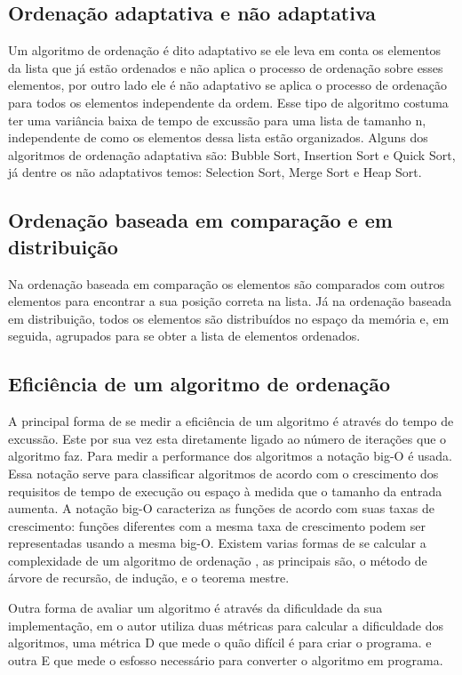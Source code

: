 \documentclass[12pt]{article}
\begin{document}
\subsection{Ordenação adaptativa e não adaptativa}
Um algoritmo de ordenação é dito adaptativo se ele leva em conta os elementos da lista que já estão ordenados e não aplica o processo de ordenação sobre esses elementos, por outro lado ele é não adaptativo se aplica o processo de ordenação para todos os elementos independente da ordem. Esse tipo de algoritmo costuma ter uma variância baixa de tempo de excussão para uma lista de tamanho n, independente de como os elementos dessa lista estão organizados. Alguns dos algoritmos de ordenação adaptativa são: Bubble Sort, Insertion Sort e Quick Sort, já dentre os não adaptativos temos: Selection Sort, Merge Sort e Heap Sort.

\subsection{Ordenação baseada em comparação e em distribuição}
Na ordenação baseada em comparação os elementos são comparados com outros elementos para encontrar a sua posição correta na lista. Já na ordenação baseada em distribuição, todos os elementos são distribuídos no espaço da memória e, em seguida, agrupados para se obter a lista de elementos ordenados. 

\subsection{Eficiência de um algoritmo de ordenação}
A principal forma de se medir a eficiência de um algoritmo é através do tempo de excussão. Este por sua vez esta diretamente ligado ao número de iterações que o algoritmo faz. Para medir a performance dos algoritmos a notação big-O \cite{black2007big} é usada. Essa notação serve para classificar algoritmos de acordo com o crescimento dos requisitos de tempo de execução ou espaço à medida que o tamanho da entrada aumenta. A notação big-O caracteriza as funções de acordo com suas taxas de crescimento: funções diferentes com a mesma taxa de crescimento podem ser representadas usando a mesma big-O. Existem varias formas de se calcular a complexidade de um algoritmo de ordenação \cite{lueker1980some}, as principais são, o método de árvore de recursão, de indução, e o teorema mestre. 

Outra forma de avaliar um algoritmo é através da dificuldade da sua implementação, em \cite{astrachan2003bubble} o autor utiliza duas métricas para calcular a dificuldade dos algoritmos, uma métrica D que mede o quão difícil é para criar o programa. e outra E que mede o esfosso necessário para converter o algoritmo em programa.
\end{document}
